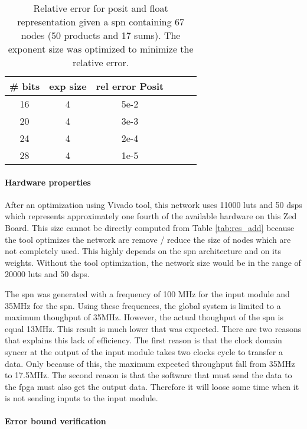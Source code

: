 \begin{table}
	\centering
	\caption{Relative error for posit and float representation given a \gls{spn} containing 67 nodes (50 products and 17 sums). The exponent size was optimized to minimize the relative error.}
	\label{tab:nethard_res}
	\begin{tabular}{|c||c|c|c||c|c|}
	\hline
		\# bits & exp size & rel error Posit \\
	\hline
		16 & 4 & 5e-2 \\
		20 & 4 & 3e-3 \\
		24 & 4 & 2e-4 \\
		28 & 4 & 1e-5 \\
	\hline
	\end{tabular}
\end{table}


\paragraph{Hardware properties}

After an optimization using Vivado tool, this network uses 11000 \glspl{lut} and 50 \glspl{dsp} which represents approximately one fourth of the available hardware on this Zed Board. This size cannot be directly computed from Table \ref{tab:res_add} because the tool optimizes the network are remove / reduce the size of nodes which are not completely used. This highly depends on the \gls{spn} architecture and on its weights. Without the tool optimization, the network size would be in the range of 20000 \glspl{lut} and 50 \glspl{dsp}.

The \gls{spn} was generated with a frequency of 100 MHz for the input module and 35MHz for the \gls{spn}. Using these frequences, the global system is limited to a maximum thoughput of 35MHz. However, the actual thoughput of the \gls{spn} is equal 13MHz. This result is much lower that was expected. There are two reasons that explains this lack of efficiency. The first reason is that the clock domain syncer at the output of the input module takes two clocks cycle to transfer a data. Only because of this, the maximum expected throughput fall from 35MHz to 17.5MHz. The second reason is that the software that must send the data to the \gls{fpga} must also get the output data. Therefore it will loose some time when it is not sending inputs to the input module.

\paragraph{Error bound verification}

